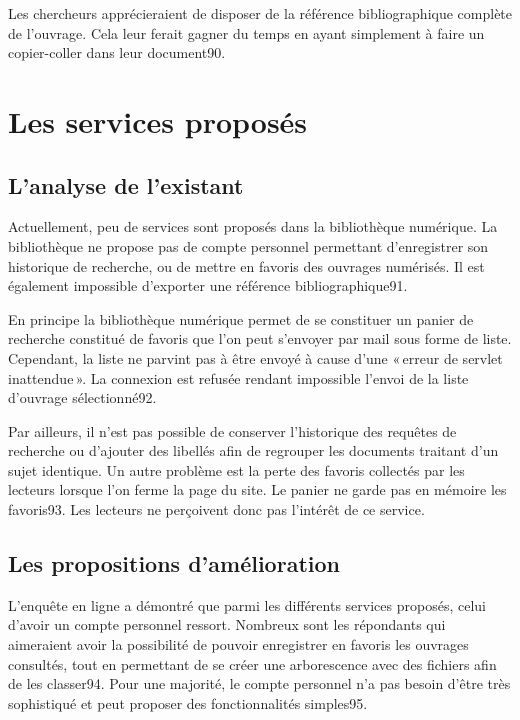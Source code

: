 Les chercheurs apprécieraient de disposer de la référence bibliographique complète de l’ouvrage. Cela leur ferait gagner du temps en ayant simplement à faire un copier-coller dans leur document90. 



\section{Les services proposés}

\subsection{L’analyse de l’existant}

Actuellement, peu de services sont proposés dans la bibliothèque numérique. La bibliothèque ne propose pas de compte personnel permettant d’enregistrer son historique de recherche, ou de mettre en favoris des ouvrages numérisés. Il est également impossible d’exporter une référence bibliographique91. 

En principe la bibliothèque numérique permet de se constituer un panier de recherche constitué de favoris que l’on peut s’envoyer par mail sous forme de liste. Cependant, la liste ne parvint pas à être envoyé à cause d’une « erreur de servlet inattendue ». La connexion est refusée rendant impossible l’envoi de la liste d’ouvrage sélectionné92.  

Par ailleurs, il n’est pas possible de conserver l’historique des requêtes de recherche ou d’ajouter des libellés afin de regrouper les documents traitant d’un sujet identique. Un autre problème est la perte des favoris collectés par les lecteurs lorsque l’on ferme la page du site. Le panier ne garde pas en mémoire les favoris93. Les lecteurs ne perçoivent donc pas l’intérêt de ce service.  

\subsection{Les propositions d’amélioration}

L’enquête en ligne a démontré que parmi les différents services proposés, celui d’avoir un compte personnel ressort. Nombreux sont les répondants qui aimeraient avoir la possibilité de pouvoir enregistrer en favoris les ouvrages consultés, tout en permettant de se créer une arborescence avec des fichiers afin de les classer94. Pour une majorité, le compte personnel n’a pas besoin d’être très sophistiqué et peut proposer des fonctionnalités simples95.  

